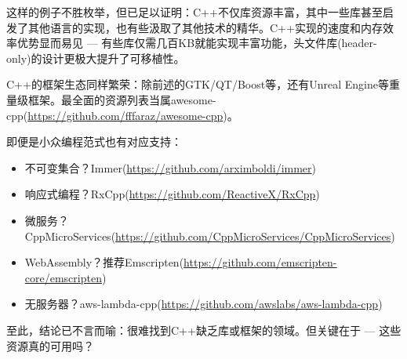 这样的例子不胜枚举，但已足以证明：C++不仅库资源丰富，其中一些库甚至启发了其他语言的实现，也有些汲取了其他技术的精华。C++实现的速度和内存效率优势显而易见 --- 有些库仅需几百KB就能实现丰富功能，头文件库(header-only)的设计更极大提升了可移植性。

C++的框架生态同样繁荣：除前述的GTK/QT/Boost等，还有Unreal Engine等重量级框架。最全面的资源列表当属awesome-cpp(\url{https://github.com/fffaraz/awesome-cpp})。

即便是小众编程范式也有对应支持：

\begin{itemize}
\item 
不可变集合？Immer(\url{https://github.com/arximboldi/immer})

\item 
响应式编程？RxCpp(\url{https://github.com/ReactiveX/RxCpp})

\item 
微服务？CppMicroServices(\url{https://github.com/CppMicroServices/CppMicroServices})

\item 
WebAssembly？推荐Emscripten(\url{https://github.com/emscripten-core/emscripten})

\item 
无服务器？aws-lambda-cpp(\url{https://github.com/awslabs/aws-lambda-cpp})
\end{itemize}

至此，结论已不言而喻：很难找到C++缺乏库或框架的领域。但关键在于 --- 这些资源真的可用吗？

















